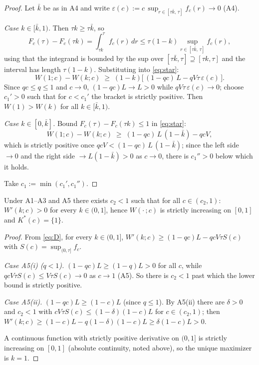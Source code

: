 \begin{proof}
Let $\bar k$ be as in A4 and write
$\varepsilon(c) := c \, \sup_{r \in [\tau\bar k,\, \tau]} f_c(r) \to 0$ (A4).

\emph{Case $k \in [\bar k, 1)$.} Then $\tau k \ge \tau\bar k$, so
\[
F_c(\tau) - F_c(\tau k)
= \int_{\tau k}^{\tau} f_c(r)\, dr
\le \tau (1 - k) \sup_{r \in [\tau\bar k,\, \tau]} f_c(r),
\]
using that the integrand is bounded by the sup over
$[\tau\bar k, \tau] \supseteq [\tau k, \tau]$ and the interval has length
$\tau(1 - k)$. Substituting into \eqref{eq:star}:
\[
W(1; c) - W(k; c) \;\ge\; (1 - k)\bigl[\, (1 - qc)\,L - qV\tau\,\varepsilon(c) \,\bigr].
\]
Since $qc \le q \le 1$ and $c \to 0$, $(1 - qc)L \to L > 0$ while
$qV\tau\,\varepsilon(c) \to 0$; choose $c_1' > 0$ such that for $c < c_1'$ the bracket
is strictly positive. Then $W(1) > W(k)$ for all $k \in [\bar k, 1)$.

\emph{Case $k \in [0, \bar k]$.} Bound $F_c(\tau) - F_c(\tau k) \le 1$ in
\eqref{eq:star}:
\[
W(1; c) - W(k; c) \;\ge\; (1 - qc)\,L\,(1 - \bar k) - qcV,
\]
which is strictly positive once $qcV < (1 - qc)\,L\,(1 - \bar k)$; since the left side
$\to 0$ and the right side $\to L(1 - \bar k) > 0$ as $c \to 0$, there is $c_1'' > 0$
below which it holds.

Take $c_1 := \min(c_1', c_1'')$.
\end{proof}

\begin{lemma}\label{lem:high}
Under A1--A3 and A5 there exists $c_2 < 1$ such that for all $c \in (c_2, 1)$:
$W'(k; c) > 0$ for every $k \in (0,1]$, hence $W(\cdot\,; c)$ is strictly increasing on
$[0,1]$ and $K^*(c) = \{1\}$.
\end{lemma}

\begin{proof}
From \eqref{eq:D}, for every $k \in (0,1]$,
$W'(k; c) \ge (1 - qc)L - qcV\tau S(c)$ with $S(c) = \sup_{(0,\tau]} f_c$.

\emph{Case A5(i) ($q < 1$).} $(1 - qc)L \ge (1 - q)L > 0$ for all $c$, while
$qcV\tau S(c) \le V\tau S(c) \to 0$ as $c \to 1$ (A5). So there is $c_2 < 1$ past which
the lower bound is strictly positive.

\emph{Case A5(ii).} $(1 - qc)L \ge (1 - c)L$ (since $q \le 1$). By A5(ii) there are
$\delta > 0$ and $c_2 < 1$ with $cV\tau S(c) \le (1 - \delta)(1 - c)L$ for
$c \in (c_2, 1)$; then
$W'(k; c) \ge (1 - c)L - q(1 - \delta)(1 - c)L \ge \delta(1 - c)L > 0$.

A continuous function with strictly positive derivative on $(0,1]$ is strictly
increasing on $[0,1]$ (absolute continuity, noted above), so the unique maximizer is
$k = 1$.
\end{proof}

